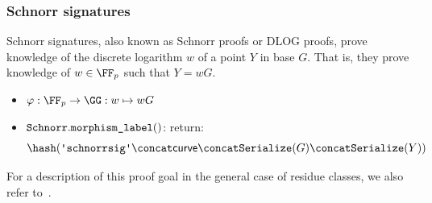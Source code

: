 \documentclass[11pt]{article}
\begin{document}
\subsubsection{Schnorr signatures}\label{sec:instantiations:schnorr}
Schnorr signatures, also known as Schnorr proofs or DLOG proofs, prove knowledge of the discrete logarithm $w$ of a point $Y$ in base $G$.
That is, they prove knowledge of $w\in\FF_p$ such that $Y=wG$.

\begin{itemize}
  \item $\varphi:\FF_p\to\GG:w\mapsto wG$
  \item $\texttt{Schnorr}.\texttt{morphism\_label}()$: return:
  \[
    \hash(\schnorrlabel \concat \curvectx \concat \serialize(G) \concat \serialize(\statement))
  \]
\end{itemize}

For a description of this proof goal in the general case of residue classes, we also refer to~\cite[1.4.1]{zkproof-reference}.

\end{document}
